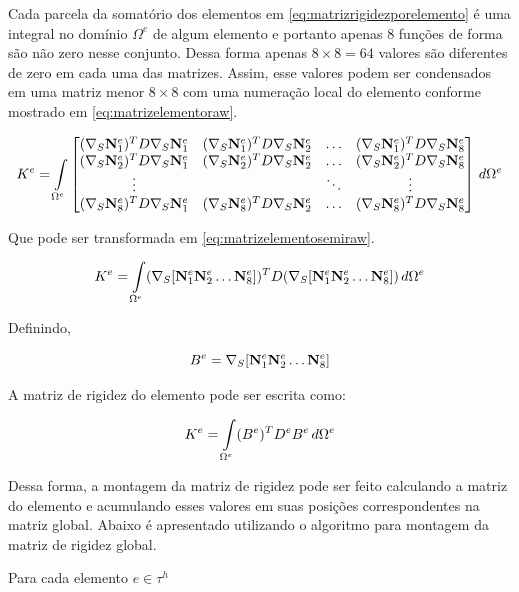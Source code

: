 Cada parcela da somatório dos elementos em \eqref{eq:matrizrigidezporelemento} é uma integral no domínio $\Omega^e$ de algum elemento e portanto apenas 8 funções de forma são não zero nesse conjunto. Dessa forma apenas $8\times8=64$ valores são diferentes de zero em cada uma das matrizes. Assim, esse valores podem ser condensados em uma matriz menor $8\times8$ com uma numeração local do elemento conforme mostrado em \eqref{eq:matrizelementoraw}.

\begin{equation}\label{eq:matrizelementoraw}
    K^e = 
\omeeint{
\begin{bmatrix}
\kije{1}{1} & \kije{1}{2}  & \hdots & \kije{1}{8}  \\ 
\kije{2}{1} & \kije{2}{2}  & \hdots & \kije{2}{8}  \\ 
\vdots      &              & \ddots & \vdots       \\ 
\kije{8}{1} & \kije{8}{2}  & \hdots & \kije{8}{8} 
\end{bmatrix}
}
\end{equation}

Que pode ser transformada em \eqref{eq:matrizelementosemiraw}.

\begin{equation}\label{eq:matrizelementosemiraw}
    K^e =\omeeint{ (\sopnabla [\basefunctionelem[1] \basefunctionelem[2] \hdots \basefunctionelem[8] ]) ^T D (\sopnabla [\basefunctionelem[1] \basefunctionelem[2] \hdots \basefunctionelem[8]])}
\end{equation}

Definindo, 

\begin{equation}
    B^e = \sopnabla [\basefunctionelem[1] \basefunctionelem[2] \hdots \basefunctionelem[8] ]
\end{equation}

A matriz de rigidez do elemento pode ser escrita como:

\begin{equation} \label{eq:}
    K^e = \omeeint{(B^e)^T D^e B^e}
\end{equation}




Dessa forma, a montagem da matriz de rigidez pode ser feito calculando a matriz do elemento e acumulando esses valores em suas posições correspondentes na matriz global. Abaixo é apresentado utilizando o algoritmo para montagem da matriz de rigidez global.

\begin{algorithmic}
\STATE Para cada elemento $e \in \tau^h$

\end{algorithmic}


